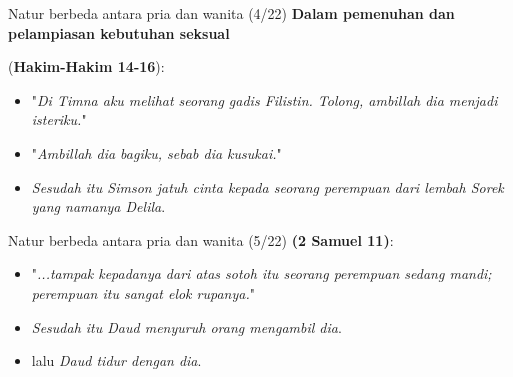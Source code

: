 \documentclass{beamer}
\theoremstyle{mystyle}
\let\emph\relax %
\begin{document}
\begin{frame}{Natur berbeda antara pria dan wanita (4/22)}
	\textbf{Dalam pemenuhan dan pelampiasan kebutuhan seksual}
	
	\bigskip
	 \emph{Samson} (\textbf{Hakim-Hakim 14-16}):
\begin{itemize}
	\item<3-> "\textit{Di Timna aku melihat seorang gadis Filistin. Tolong, ambillah dia menjadi isteriku.}"
	\item<4-> "\textit{Ambillah dia bagiku, sebab dia kusukai.}"
	\item<5-> \textit{Sesudah itu Simson jatuh cinta kepada seorang perempuan dari lembah Sorek yang namanya Delila}.
\end{itemize}
\end{frame}

\begin{frame}{Natur berbeda antara pria dan wanita (5/22)}
	\emph{Daud} \textbf{(2 Samuel 11)}: 
	\begin{itemize}
		\item<2-> "\textit{...tampak kepadanya dari atas sotoh itu seorang perempuan sedang mandi; perempuan itu sangat elok rupanya.}" 
		\item<3-> \textit{Sesudah itu Daud menyuruh orang mengambil dia}.
		\item<4-> lalu \textit{Daud tidur dengan dia}.
	\end{itemize}		
\end{frame}
\end{document}
